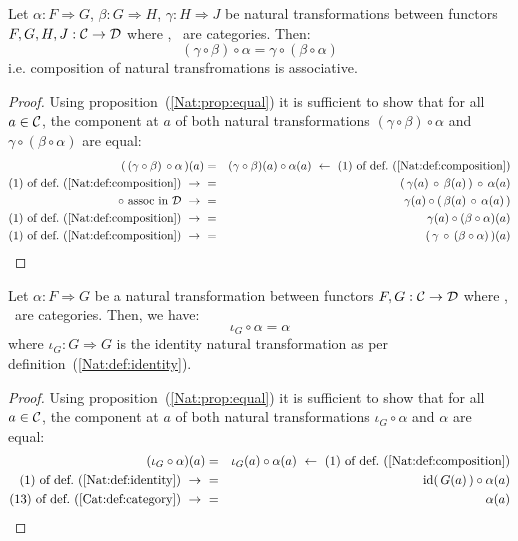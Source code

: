 \begin{prop}\label{Nat:prop:associative}
    Let $\alpha:F\Rightarrow G$, $\beta:G\Rightarrow H$, $\gamma:H\Rightarrow J$ 
    be natural transformations between functors $F,G,H,J:\mbox{$\cal C$}\to\mbox{$\cal D$}$ where 
    \Cat, \Dat\ are categories. Then:
        \[
            (\gamma \circ \beta)\circ\alpha=\gamma\circ(\beta\circ\alpha)
        \]
    i.e. composition of natural transfromations is associative.
\end{prop}
\begin{proof}
    Using proposition~(\ref{Nat:prop:equal}) it is sufficient to show that for 
    all $a\in\mbox{$\cal C$}$, the component at $a$ of both natural transformations
    $(\gamma \circ \beta)\circ\alpha$ and $\gamma\circ(\beta\circ\alpha)$ 
    are equal:
        \begin{eqnarray*}(\,(\gamma\circ\beta)\,\circ\alpha\,)(a)
            &=&(\gamma\circ\beta)(a)\circ\alpha(a)
            \ \leftarrow\ \mbox{$(1)$ of def.~(\ref{Nat:def:composition})}\\
            \mbox{$(1)$ of def.~(\ref{Nat:def:composition})}\ \to\ 
            &=&(\,\gamma(a)\,\circ\,\beta(a)\,)\,\circ\,\alpha(a)\\
            \mbox{$\circ$ assoc in \Dat}\ \to\ 
            &=&\gamma(a)\circ(\,\beta(a)\,\circ\,\alpha(a)\,)\\
            \mbox{$(1)$ of def.~(\ref{Nat:def:composition})}\ \to\ 
            &=&\gamma(a)\circ(\beta\circ\alpha)(a)\\
            \mbox{$(1)$ of def.~(\ref{Nat:def:composition})}\ \to\ 
            &=&(\,\gamma\,\circ\,(\beta\circ\alpha)\,)(a)
        \end{eqnarray*}
\end{proof}

\begin{prop}\label{Nat:prop:left:identity}
    Let $\alpha:F\Rightarrow G$ be a natural transformation between 
    functors $F,G:\mbox{$\cal C$}\to\mbox{$\cal D$}$ where \Cat, \Dat\ are categories. Then, we have:
        \[
            \iota_{G}\circ\alpha = \alpha
        \]
    where $\iota_{G}:G\Rightarrow G$ is the identity natural transformation
    as per definition~(\ref{Nat:def:identity}).
\end{prop}
\begin{proof}
    Using proposition~(\ref{Nat:prop:equal}) it is sufficient to show that for 
    all $a\in\mbox{$\cal C$}$, the component at $a$ of both natural transformations
    $\iota_{G}\circ\alpha$ and $\alpha$ are equal:
    \begin{eqnarray*} (\iota_{G}\circ\alpha)(a)
        &=&\iota_{G}(a)\circ\alpha(a)
        \ \leftarrow\ \mbox{$(1)$ of def.~(\ref{Nat:def:composition})}\\
        \mbox{$(1)$ of def.~(\ref{Nat:def:identity})}\ \to\ 
        &=&\id(\,G(a)\,)\circ\alpha(a)\\
        \mbox{$(13)$ of def.~(\ref{Cat:def:category})}\ \to\ 
        &=&\alpha(a)
    \end{eqnarray*}
\end{proof}

